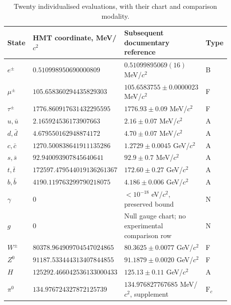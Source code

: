 \begingroup
\small
\setlength{\tabcolsep}{3pt}
\begin{table}[!htbp]
\centering\fontsize{8.8}{10.2}\selectfont
\setlength{\tabcolsep}{4pt}\renewcommand{\arraystretch}{1.04}
\caption{Twenty individualised evaluations, with their chart and comparison modality.}
\label{tab:vi-evaluaciones-veinte}
\begin{tabular}{p{0.13\linewidth}p{0.32\linewidth}p{0.38\linewidth}p{0.07\linewidth}}

\toprule
State & HMT coordinate, MeV/\(c^2\) & Subsequent documentary reference & Type\\
\midrule

\(e^\pm\) & \(0.510998950\allowbreak690000809\) & \(0.51099895069(16)\) MeV/\(c^2\) & B\\
\(\mu^\pm\) & \(105.658360294\allowbreak435829303\) & \(105.6583755\pm0.0000023\) MeV/\(c^2\) & F\\
\(\tau^\pm\) & \(1776.860917631\allowbreak432295595\) & \(1776.93\pm0.09\) MeV/\(c^2\) & F\\
\(u,\bar u\) & \(2.165924536\allowbreak173907663\) & \(2.16\pm0.07\) MeV/\(c^2\) & A\\
\(d,\bar d\) & \(4.679550162\allowbreak948874172\) & \(4.70\pm0.07\) MeV/\(c^2\) & A\\
\(c,\bar c\) & \(1270.500838641\allowbreak911135286\) & \(1.2729\pm0.0045\) GeV/\(c^2\) & A\\
\(s,\bar s\) & \(92.940093907\allowbreak845640641\) & \(92.9\pm0.7\) MeV/\(c^2\) & A\\
\(t,\bar t\) & \(172597.479544019\allowbreak136261367\) & \(172.60\pm0.27\) GeV/\(c^2\) & A\\
\(b,\bar b\) & \(4190.119763299\allowbreak790218075\) & \(4.186\pm0.006\) GeV/\(c^2\) & A\\
\(\gamma\) & \(0\) & \(<10^{-18}\) eV/\(c^2\), preserved bound & N\\
\(g\) & \(0\) & Null gauge chart; no experimental comparison row & N\\
\(W^\pm\) & \(80378.964909704\allowbreak547024865\) & \(80.3625\pm0.0077\) GeV/\(c^2\) & F\\
\(Z^0\) & \(91187.533444313\allowbreak407844855\) & \(91.1879\pm0.0020\) GeV/\(c^2\) & F\\
\(H\) & \(125292.466042536\allowbreak133000433\) & \(125.13\pm0.11\) GeV/\(c^2\) & A\\
\(\pi^0\) & \(134.976724327\allowbreak872125739\) & \(134.976827767685\) MeV/\(c^2\), supplement & \(\mathrm F_c\)\\

\end{tabular}
\end{table}
